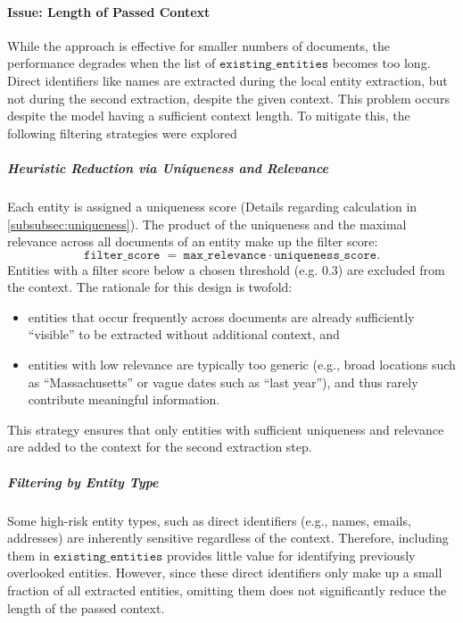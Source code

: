 \paragraph{Issue: Length of Passed Context}
While the approach is effective for smaller numbers of documents, the performance degrades when the list of $\texttt{existing\_entities}$ becomes too long. Direct identifiers like names are extracted during the local entity extraction, but not during the second extraction, despite the given context. This problem occurs despite the model having a sufficient context length. To mitigate this, the following filtering strategies were explored %

\subparagraph{Heuristic Reduction via Uniqueness and Relevance}
Each entity is assigned a uniqueness score (Details regarding calculation in \ref{subsubsec:uniqueness}). The product of the uniqueness and the maximal relevance across all documents of an entity make up the filter score:
\[
    \texttt{filter\_score} \;=\; \texttt{max\_relevance} \cdot \texttt{uniqueness\_score}.
\]
Entities with a filter score below a chosen threshold (e.g. $0.3$) are excluded from the context. The rationale for this design is twofold:
\begin{itemize}
    \item entities that occur frequently across documents are already sufficiently ``visible'' to be extracted without additional context, and
    \item entities with low relevance are typically too generic (e.g., broad locations such as ``Massachusetts'' or vague dates such as ``last year''), and thus rarely contribute meaningful information.
\end{itemize}
This strategy ensures that only entities with sufficient uniqueness and relevance are added to the context for the second extraction step. %


\subparagraph{Filtering by Entity Type}\label{subpar:type_filtering}
Some high-risk entity types, such as direct identifiers (e.g., names, emails, addresses) are inherently sensitive regardless of the context. Therefore, including them in $\texttt{existing\_entities}$ provides little value for identifying previously overlooked entities. However, since these direct identifiers only make up a small fraction of all extracted entities, omitting them does not significantly reduce the length of the passed context.

